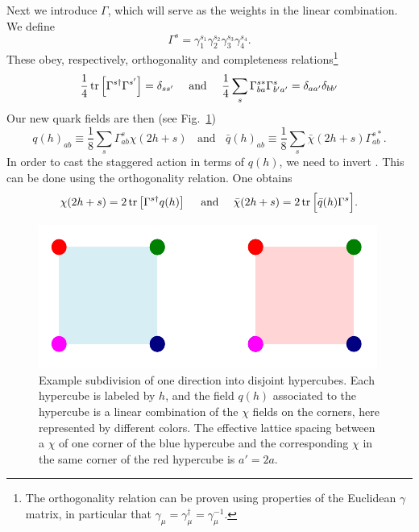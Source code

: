 Next we introduce $\Gamma$, which will serve as the weights in the linear
combination. We define
\begin{equation}
  \Gamma^s=\gamma_1^{s_1}\gamma_2^{s_2}\gamma_3^{s_3}\gamma_4^{s_4}.
\end{equation}
These obey, respectively, orthogonality and completeness 
relations\footnote{The orthogonality relation can be proven using
properties of the Euclidean $\gamma$ matrix, in particular that
$\gamma_\mu=\gamma_\mu^\dagger=\gamma_\mu^{-1}$.} 
\begin{equation}
\frac{1}{4}\tr\left[\Gamma^{s\dagger}\Gamma^{s'}\right]=\delta_{ss'}
~~~~\text{and}~~~~
\frac{1}{4}\sum_s\Gamma_{ba}^{s*}\Gamma_{b'a'}^s=\delta_{aa'}\delta_{bb'}
\end{equation}
Our new quark fields are then (see Fig.~\ref{fig:staggHypercubes})
\begin{equation}\label{eq:staggqdef}
  q(h)_{ab}\equiv\frac{1}{8}\sum_s\Gamma^s_{ab}\chi(2h+s)
~~~~\text{and}~~~~
  \bar{q}(h)_{ab}\equiv\frac{1}{8}\sum_s\bar{\chi}(2h+s)\Gamma^{s*}_{ab}.
\end{equation}
In order to cast the staggered action in terms of $q(h)$, we need to
invert . This can be done using the
orthogonality relation. One obtains
\begin{equation}
  \chi(2h+s)=2\tr\left[\Gamma^{s\dagger}q(h)\right]
  ~~~~\text{and}~~~~
  \bar{\chi}(2h+s)=2\tr\Big[\bar{q}(h)\Gamma^s\Big].
\end{equation}

\begin{figure}[t]
  \centering
  \includegraphics{figs/staggHypercubes.pdf}
  \caption{Example subdivision of one direction into disjoint hypercubes.
           Each hypercube is labeled by $h$, and the field $q(h)$
           associated to the hypercube is a linear combination of the
           $\chi$ fields on the corners, here represented by
           different colors. The effective lattice spacing between
           a $\chi$ of one corner of the blue hypercube and the corresponding
           $\chi$ in the same corner of the red hypercube is $a'=2a$.
           }
  \label{fig:staggHypercubes}
\end{figure}

